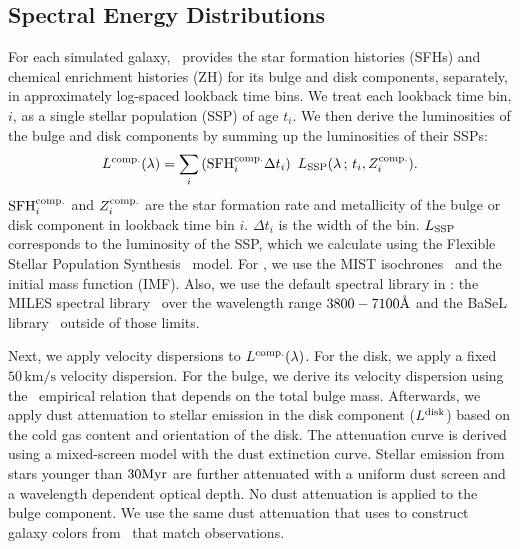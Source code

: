 
\subsection{Spectral Energy Distributions} \label{sec:sed}
For each simulated galaxy, \lgal~provides the star formation histories (SFHs)
and chemical enrichment histories (ZH) for its bulge and disk components,
separately, in approximately log-spaced lookback time bins.  
We treat each lookback time bin, $i$, as a single stellar population (SSP) of
age $t_i$.
We then derive the luminosities of the bulge and disk components by summing up
the luminosities of their SSPs:
\begin{equation}
    L^{\rm comp.}(\lambda) = \sum \limits_i \left({\rm SFH}^{\rm comp.}_i
    \Delta t_i\right)~L_{\rm SSP}(\lambda\,;\, t_i, Z^{\rm comp.}_i). 
\end{equation}
${\rm SFH}^{\rm comp.}_i$ and $Z^{\rm comp.}_i$ are the star formation rate and
metallicity of the bulge or disk component in lookback time bin $i$. 
$\Delta t_i$ is the width of the bin. 
$L_{\rm SSP}$ corresponds to the luminosity of the SSP, which we calculate
using the Flexible Stellar Population Synthesis~\citep[\fsps;][]{conroy2009,
conroy2010c} model.
For \fsps, we use the MIST isochrones~\citep{paxton2011, paxton2013,
paxton2015, choi2016, dotter2016} and the \cite{chabrier2003} initial mass
function (IMF). 
Also, we use the default spectral library in \fsps: the MILES spectral
library~\citep{sanchez-blazquez2006} over the wavelength range
$3800-7100\AA$ and the BaSeL
library~\citep{lejeune1997, lejeune1998, westera2002} 
outside of those limits.

Next, we apply velocity dispersions to $L^{\rm comp.}(\lambda)$.
For the disk, we apply a fixed $50\,\mathrm{km/s}$ velocity dispersion. 
For the bulge, we derive its velocity dispersion using the~\cite{zahid2016}
empirical relation that depends on the total bulge mass.
Afterwards, we apply dust attenuation to stellar emission in the disk component
($L^{\rm disk}$) based on the cold gas content and orientation of the disk. 
The attenuation curve is derived using a mixed-screen model with the
\cite{mathis1983} dust extinction curve. 
Stellar emission from stars younger than $30{\rm Myr}$ are further attenuated
with a uniform dust screen and a wavelength dependent optical depth.
No dust attenuation is applied to the bulge component.
We use the same dust attenuation that \cite{henriques2015} uses to construct
galaxy colors from \lgal~that match observations. 


